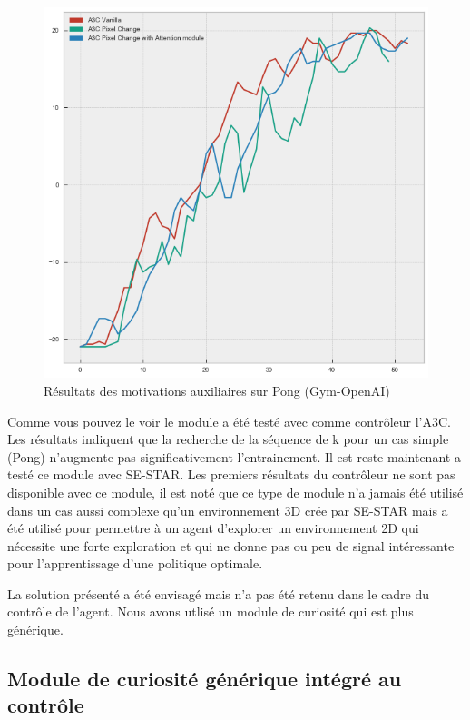 \begin{figure}[h!]
    \begin{center}
        \includegraphics[scale=.35]{./assets/CURIOSITY/A3C_auxiliaire.png}
        \caption{Résultats des motivations auxiliaires sur Pong (Gym-OpenAI)}
    \end{center}
\end{figure}

Comme vous pouvez le voir le module a été testé avec comme contrôleur l'A3C. Les résultats indiquent que la recherche de la séquence de k pour un cas simple (Pong) n'augmente pas significativement l'entrainement. Il est reste maintenant a testé ce module avec SE-STAR. Les premiers résultats du contrôleur ne sont pas disponible avec ce module, il est noté que ce type de module n'a jamais été utilisé dans un cas aussi complexe qu'un environnement 3D crée par SE-STAR mais a été utilisé pour permettre à un agent d'explorer un environnement 2D qui nécessite une forte exploration et qui ne donne pas ou peu de signal intéressante pour l'apprentissage d'une politique optimale.

La solution présenté a été envisagé mais n'a pas été retenu dans le cadre du contrôle de l'agent. Nous avons utlisé un module de curiosité qui est plus générique.

\subsection{Module de curiosité générique intégré au contrôle}

